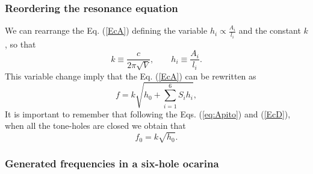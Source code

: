\documentclass[11pt,twocolumn]{article}
\begin{document}
\subsubsection{Reordering the resonance equation}
We can rearrange the Eq. (\ref{EcA}) defining the variable $h_{i}\propto \frac{A_{i}}{l_{i}}$ 
and the constant $k$, so that
\begin{equation} \label{EcC}
k \equiv \frac{c}{2 {\pi}\sqrt{V}},\qquad  h_{i} \equiv  \frac{A_{i}}{l_{i}}.
\end{equation}
This variable change imply that the Eq. (\ref{EcA}) can be rewritten as
\begin{equation} \label{EcD}
f = k \sqrt{h_0 +\sum_{i=1}^{6}{S_i h_i}},
\end{equation}
It is important to remember that following the Eqs. (\ref{eq:Apito}) and (\ref{EcD}),
when all the tone-holes are closed we obtain that 
\begin{equation} \label{EcDa}
f_0 = k \sqrt{h_0}. %
\end{equation}

\subsubsection{Generated frequencies in a six-hole ocarina}
\end{document}
